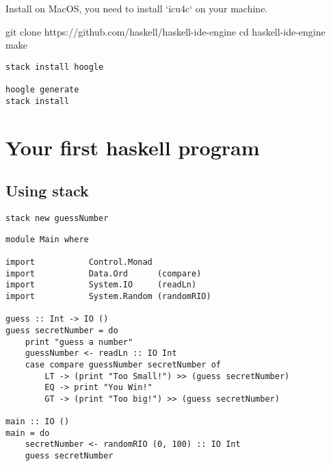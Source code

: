 Install on MacOS, you need to install `icu4c` on your machine.

git clone https://github.com/haskell/haskell-ide-engine
cd haskell-ide-engine
make



\begin{verbatim}
stack install hoogle

hoogle generate
stack install
\end{verbatim}


\section{Your first haskell program}
\subsection{Using stack}
\verb|stack new guessNumber|

\begin{verbatim}
module Main where

import           Control.Monad
import           Data.Ord      (compare)
import           System.IO     (readLn)
import           System.Random (randomRIO)

guess :: Int -> IO ()
guess secretNumber = do
    print "guess a number"
    guessNumber <- readLn :: IO Int
    case compare guessNumber secretNumber of
        LT -> (print "Too Small!") >> (guess secretNumber)
        EQ -> print "You Win!"
        GT -> (print "Too big!") >> (guess secretNumber)

main :: IO ()
main = do
    secretNumber <- randomRIO (0, 100) :: IO Int
    guess secretNumber
\end{verbatim}
